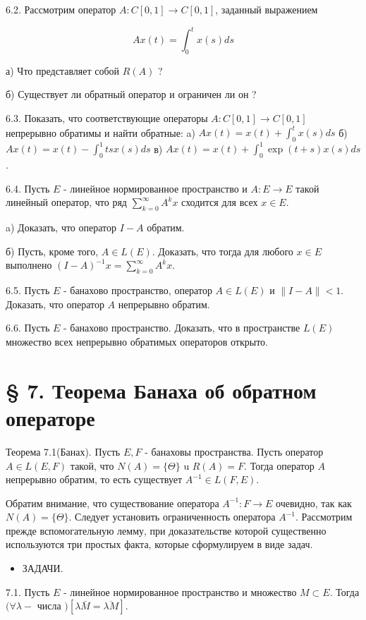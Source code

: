 6.2. Рассмотрим оператор $A: C[0,1] \rightarrow C[0,1]$, заданный выражением

$$
A x(t)=\int_{0}^{t} x(s) d s
$$

а) Что представляет собой $R(A)$ ?

б) Существует ли обратный оператор и ограничен ли он ?

6.3. Показать, что соответствующие операторы $A: C[0,1] \rightarrow C[0,1]$ непрерывно обратимы и найти обратные:
a) $A x(t)=x(t)+\int_{0}^{t} x(s) d s$
б) $A x(t)=x(t)-\int_{0}^{1} t s x(s) d s$
в) $A x(t)=x(t)+\int_{0}^{1} \exp (t+s) x(s) d s$.

6.4. Пусть $E$ - линейное нормированное пространство и $A: E \rightarrow E$ такой линейный оператор, что ряд $\sum_{k=0}^{\infty} A^{k} x$ сходится для всех $x \in E$.

a) Доказать, что оператор $I-A$ обратим.

б) Пусть, кроме того, $A \in L(E)$. Доказать, что тогда для любого $x \in E$ выполнено $(I-A)^{-1} x=\sum_{k=0}^{\infty} A^{k} x$.

6.5. Пусть $E$ - банахово пространство, оператор $A \in L(E)$ и $\|I-A\|<1$. Доказать, что оператор $A$ непрерывно обратим.

6.6. Пусть $E$ - банахово пространство. Доказать, что в пространстве $L(E)$ множество всех непрерывно обратимых операторов открыто.

\section*{§ 7. Теорема Банаха об обратном операторе}
Теорема 7.1(Банах). Пусть $E, F$ - банаховы пространства. Пусть оператор $A \in L(E, F)$ такой, что $N(A)=\{\Theta\}$ u $R(A)=F$. Тогда оператор $A$ непрерывно обратим, то есть существует $A^{-1} \in L(F, E)$.

Обратим внимание, что существование оператора $A^{-1}: F \rightarrow E$ очевидно, так как $N(A)=\{\Theta\}$. Следует установить ограниченность оператора $A^{-1}$. Рассмотрим прежде вспомогательную лемму, при доказательстве которой существенно используются три простых факта, которые сформулируем в виде задач.

\begin{itemize}
  \item ЗАДАЧИ.
\end{itemize}

7.1. Пусть $E$ - линейное нормированное пространство и множество $M \subset E$. Тогда $(\forall \lambda-$ числа $)[\lambda \bar{M}=\overline{\lambda M}]$.

